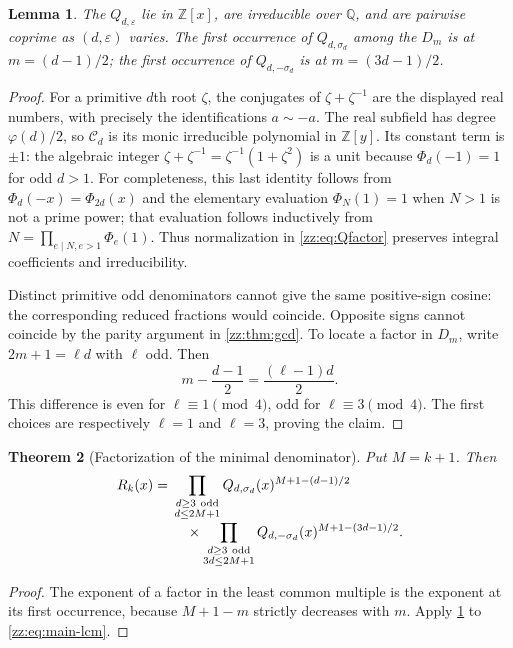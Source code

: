 \documentclass[11pt,a4paper]{article}
\newtheorem{theorem}{Theorem}[section]
\newtheorem{lemma}[theorem]{Lemma}
\theoremstyle{definition}
\newcommand{\Z}{\mathbb{Z}}
\newcommand{\Q}{\mathbb{Q}}
\newcommand{\eps}{\varepsilon}
\begin{document}
\begin{lemma}
\label{zz:lem:cyclotomic}
The $Q_{d,\eps}$ lie in $\Z[x]$, are irreducible over $\Q$, and are pairwise
coprime as $(d,\eps)$ varies.  The first occurrence of
$Q_{d,\sigma_d}$ among the $D_m$ is at $m=(d-1)/2$;
the first occurrence of $Q_{d,-\sigma_d}$ is at $m=(3d-1)/2$.
\end{lemma}
\begin{proof}
For a primitive $d$th root $\zeta$, the conjugates of
$\zeta+\zeta^{-1}$ are the displayed real numbers, with precisely the
identifications $a\sim-a$.  The real subfield has degree $\varphi(d)/2$,
so $\mathcal C_d$ is its monic irreducible polynomial in $\Z[y]$.
Its constant term is $\pm1$: the algebraic integer
$\zeta+\zeta^{-1}=\zeta^{-1}(1+\zeta^2)$ is a unit because
$\Phi_d(-1)=1$ for odd $d>1$.
For completeness, this last identity follows from
$\Phi_d(-x)=\Phi_{2d}(x)$ and the elementary evaluation
$\Phi_N(1)=1$ when $N>1$ is not a prime power; that evaluation follows
inductively from $N=\prod_{e\mid N,e>1}\Phi_e(1)$.
Thus normalization in \eqref{zz:eq:Qfactor} preserves integral coefficients
and irreducibility.

Distinct primitive odd denominators cannot give the same positive-sign
cosine: the corresponding reduced fractions would coincide.  Opposite signs
cannot coincide by the parity argument in \cref{zz:thm:gcd}.
To locate a factor in $D_m$, write $2m+1=\ell d$ with $\ell$ odd.
Then
\[
 m-\frac{d-1}{2}=\frac{(\ell-1)d}{2}.
\]
This difference is even for $\ell\equiv1\pmod4$, odd for
$\ell\equiv3\pmod4$.  The first choices are respectively $\ell=1$ and
$\ell=3$, proving the claim.
\end{proof}

\begin{theorem}[Factorization of the minimal denominator]
\label{zz:thm:factorization}
Put $M=k+1$.  Then
\begin{align}\label{zz:eq:Rfactor}
 R_k(x)={}&
 \prod_{\substack{d\ge3\ \mathrm{odd}\\d\le2M+1}}
 Q_{d,\sigma_d}(x)^{M+1-(d-1)/2}\notag\\[-1mm]
 &\quad\times
 \prod_{\substack{d\ge3\ \mathrm{odd}\\3d\le2M+1}}
 Q_{d,-\sigma_d}(x)^{M+1-(3d-1)/2}.
\end{align}
\end{theorem}
\begin{proof}
The exponent of a factor in the least common multiple is the exponent at its
first occurrence, because $M+1-m$ strictly decreases with $m$.
Apply \cref{zz:lem:cyclotomic} to \eqref{zz:eq:main-lcm}.
\end{proof}
\end{document}

